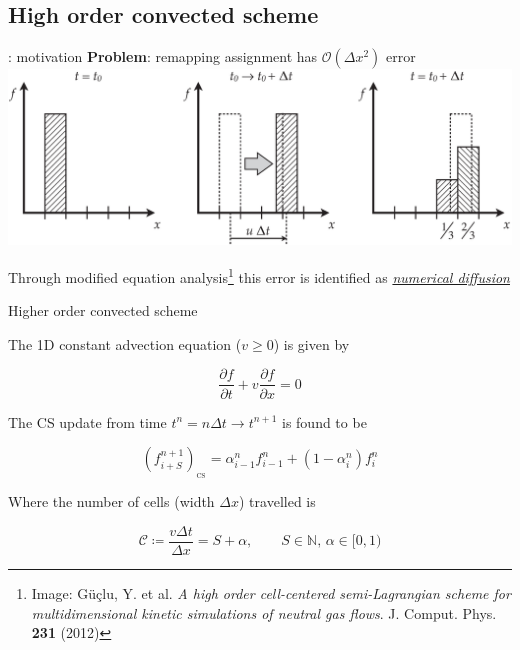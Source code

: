\documentclass{beamer}
\begin{document}
\subsection{High order convected scheme}


\begin{frame}{\subsecname : motivation}
\textbf{Problem}: remapping assignment has $\mathcal{O}(\Delta x^2)$ error 
\includegraphics[width=\textwidth]{graphics/ClassicCS_diffusion}

Through modified equation analysis\footnote{Image: G\"{u}\c{c}lu, Y. et al. \emph{A high order cell-centered semi-Lagrangian scheme for multidimensional kinetic simulations of neutral gas flows}. J. Comput. Phys. \textbf{231} (2012)} this error is identified as \underline{\emph{numerical diffusion}}



\end{frame}


\begin{frame}{Higher order convected scheme}

The 1D constant advection equation ($v \geq 0$) is given by

$$\frac{\partial f}{\partial t} + v\frac{\partial f}{\partial x} = 0$$

The CS update from time $t^n = n\Delta t \rightarrow t^{n+1}$ is found to be 

$$(f_{i+S}^{n+1})_{_{\mathrm{CS}}} = \alpha_{i-1}^{n} f_{i-1}^n + (1 - \alpha_i^n)f_i^n$$

Where the number of cells (width $\Delta x$) travelled is 

$$\mathcal{C} \coloneqq \frac{v\Delta t}{\Delta x} = S + \alpha, \qquad S\in\mathbb{N},\, \alpha\in [0,1)$$


\end{frame}
\end{document}

